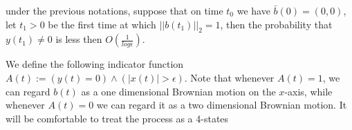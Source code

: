 {\begin{propos}\label{prop:reph}
under the previous notations, suppose that on time $t_0$ we have $\bar{b}(0)=(0,0)$, let $t_1>0$ be the first time at which $||b(t_1)||_2=1$, then the probability that $y(t_1)\neq0$ is less then $O(\frac1{log\epsilon})$.
\end{propos}

We define the following indicator function $A(t):=(y(t)=0)\wedge(|x(t)|>\epsilon)$. Note that whenever $A(t)=1$, we can regard $b(t)$ as a one dimensional Brownian motion on the $x$-axis, while whenever $A(t)=0$ we can regard it as a two dimensional Brownian motion. It will be comfortable to treat the process as a 4-states 
}

